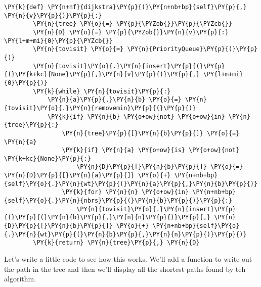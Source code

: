 \begin{Verbatim}[commandchars=\\\{\}]
    \PY{k}{def} \PY{n+nf}{dijkstra}\PY{p}{(}\PY{n+nb+bp}{self}\PY{p}{,} \PY{n}{v}\PY{p}{)}\PY{p}{:}
        \PY{n}{tree} \PY{o}{=} \PY{p}{\PYZob{}}\PY{p}{\PYZcb{}}
        \PY{n}{D} \PY{o}{=} \PY{p}{\PYZob{}}\PY{n}{v}\PY{p}{:} \PY{l+m+mi}{0}\PY{p}{\PYZcb{}}
        \PY{n}{tovisit} \PY{o}{=} \PY{n}{PriorityQueue}\PY{p}{(}\PY{p}{)}
        \PY{n}{tovisit}\PY{o}{.}\PY{n}{insert}\PY{p}{(}\PY{p}{(}\PY{k+kc}{None}\PY{p}{,}\PY{n}{v}\PY{p}{)}\PY{p}{,} \PY{l+m+mi}{0}\PY{p}{)}
        \PY{k}{while} \PY{n}{tovisit}\PY{p}{:}
            \PY{n}{a}\PY{p}{,}\PY{n}{b} \PY{o}{=} \PY{n}{tovisit}\PY{o}{.}\PY{n}{removemin}\PY{p}{(}\PY{p}{)}
            \PY{k}{if} \PY{n}{b} \PY{o+ow}{not} \PY{o+ow}{in} \PY{n}{tree}\PY{p}{:}
                \PY{n}{tree}\PY{p}{[}\PY{n}{b}\PY{p}{]} \PY{o}{=} \PY{n}{a}
                \PY{k}{if} \PY{n}{a} \PY{o+ow}{is} \PY{o+ow}{not} \PY{k+kc}{None}\PY{p}{:}
                    \PY{n}{D}\PY{p}{[}\PY{n}{b}\PY{p}{]} \PY{o}{=} \PY{n}{D}\PY{p}{[}\PY{n}{a}\PY{p}{]} \PY{o}{+} \PY{n+nb+bp}{self}\PY{o}{.}\PY{n}{wt}\PY{p}{(}\PY{n}{a}\PY{p}{,}\PY{n}{b}\PY{p}{)}
                \PY{k}{for} \PY{n}{n} \PY{o+ow}{in} \PY{n+nb+bp}{self}\PY{o}{.}\PY{n}{nbrs}\PY{p}{(}\PY{n}{b}\PY{p}{)}\PY{p}{:}
                    \PY{n}{tovisit}\PY{o}{.}\PY{n}{insert}\PY{p}{(}\PY{p}{(}\PY{n}{b}\PY{p}{,}\PY{n}{n}\PY{p}{)}\PY{p}{,} \PY{n}{D}\PY{p}{[}\PY{n}{b}\PY{p}{]} \PY{o}{+} \PY{n+nb+bp}{self}\PY{o}{.}\PY{n}{wt}\PY{p}{(}\PY{n}{b}\PY{p}{,}\PY{n}{n}\PY{p}{)}\PY{p}{)}
        \PY{k}{return} \PY{n}{tree}\PY{p}{,} \PY{n}{D}
\end{Verbatim}



Let's write a little code to see how this works.
We'll add a function to write out the path in the tree and then we'll display all the shortest paths found by teh algorithm.

